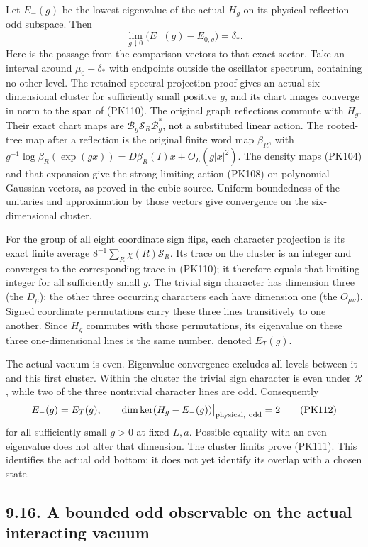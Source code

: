 \documentclass[11pt]{article}
\begin{document}
Let \(E_-(g)\) be the lowest eigenvalue of the actual \(H_g\) on its
physical reflection-odd subspace. Then
\[
 \lim_{g\downarrow0}\bigl(E_-(g)-E_{0,g}\bigr)=\delta_* .
 \tag{PK111}
\]
Here is the passage from the comparison vectors to that exact sector.
Take an interval around \(\mu_0+\delta_*\) with endpoints outside the
oscillator spectrum, containing no other level. The retained spectral
projection proof gives an actual six-dimensional cluster for sufficiently
small positive \(g\), and its chart images converge in norm to the
span of (PK110). The original graph reflections commute with \(H_g\).
Their exact chart maps are \(\mathcal B_g\mathscr S_R\mathcal B_g^*\),
not a substituted linear action. The rooted-tree map after a reflection
is the original finite word map \(\beta_R\), with
\(g^{-1}\log\beta_R(\exp(gx))=D\beta_R(I)x+O_L(g|x|^2)\).
The density maps (PK104) and that expansion give the strong limiting
action (PK108) on polynomial Gaussian vectors, as proved in the cubic
source. Uniform boundedness of the unitaries and approximation by those
vectors give convergence on the six-dimensional cluster.

For the group of all eight coordinate sign flips, each character
projection is its exact finite average
\(8^{-1}\sum_R\chi(R)\mathscr S_R\). Its trace on the cluster is
an integer and converges to the corresponding trace in (PK110);
it therefore equals that limiting integer for all sufficiently small
\(g\). The trivial sign character has dimension three (the \(D_\mu\));
the other three occurring characters each have dimension one
(the \(O_{\mu\nu}\)). Signed coordinate permutations carry these
three lines transitively to one another. Since \(H_g\) commutes with
those permutations, its eigenvalue on these three one-dimensional
lines is the same number, denoted \(E_T(g)\).

The actual vacuum is even. Eigenvalue convergence excludes all levels
between it and this first cluster. Within the cluster the trivial
sign character is even under \(\mathcal R\), while two of the three
nontrivial character lines are odd. Consequently
\[
 E_-(g)=E_T(g),\qquad
 \dim\ker(H_g-E_-(g))\big|_{\rm physical,\ odd}=2
 \tag{PK112}
\]
for all sufficiently small \(g>0\) at fixed \(L,a\).
Possible equality with an even eigenvalue does not alter that dimension.
The cluster limits prove (PK111). This identifies the actual odd
bottom; it does not yet identify its overlap with a chosen state.

\subsection*{9.16. A bounded odd observable on the actual interacting vacuum}
\end{document}
